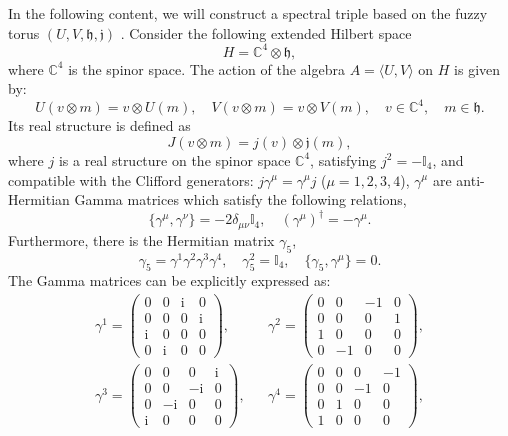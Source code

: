 \documentclass[a4paper,11pt]{article}
\begin{document}
In the following content, we will construct a spectral triple based on the fuzzy torus
$(U, V, \mathfrak{h}, \mathfrak{j})$ \cite{Bigatti1}. Consider the following
extended Hilbert space
\begin{equation}
  H =\mathbb{C}^4 \otimes \mathfrak{h},
\end{equation}
where $\mathbb{C}^4$ is the spinor space. The action of the algebra $A =
\langle U, V \rangle$ on $H$ is given by:
\begin{equation}
  U (v \otimes m) = v \otimes U (m), \quad V (v \otimes m) = v \otimes V (m),
  \quad v \in \mathbb{C}^4, \quad m \in \mathfrak{h}.
\end{equation}
Its real structure is defined as
\begin{equation}
  J (v \otimes m) = j (v) \otimes \mathfrak{j} (m),
\end{equation}
where $j$ is a real structure on the spinor space $\mathbb{C}^4$, satisfying
$j^2 = -\mathbb{I}_4$, and compatible with the Clifford generators: $j
\gamma^{\mu} = \gamma^{\mu} j$ ($\mu = 1, 2, 3, 4$), $\gamma^{\mu}$ are
anti-Hermitian Gamma matrices which satisfy the following relations,
\begin{equation}
  \{\gamma^{\mu}, \gamma^{\nu} \} = - 2 \delta_{\mu \nu} \mathbb{I}_4, \quad
  (\gamma^{\mu})^{\dag} = - \gamma^{\mu}.
\end{equation}
Furthermore, there is the Hermitian matrix $\gamma_5$,
\begin{equation}
  \gamma_5 = \gamma^1 \gamma^2 \gamma^3 \gamma^4, \quad \gamma_5^2
  =\mathbb{I}_4, \quad \{\gamma_5, \gamma^{\mu} \} = 0.
\end{equation}
The Gamma matrices can be explicitly expressed as:
\begin{eqnarray}
  \gamma^1 = \left( \begin{array}{cccc}
    0 & 0 & \mathrm{i} & 0\\
    0 & 0 & 0 & \mathrm{i}\\
    \mathrm{i} & 0 & 0 & 0\\
    0 & \mathrm{i} & 0 & 0
  \end{array} \right), && \gamma^2 = \left( \begin{array}{cccc}
    0 & 0 & - 1 & 0\\
    0 & 0 & 0 & 1\\
    1 & 0 & 0 & 0\\
    0 & - 1 & 0 & 0
  \end{array} \right),
\nonumber\\
  \gamma^3 = \left( \begin{array}{cccc}
    0 & 0 & 0 & \mathrm{i}\\
    0 & 0 & - \mathrm{i} & 0\\
    0 & - \mathrm{i} & 0 & 0\\
    \mathrm{i} & 0 & 0 & 0
  \end{array} \right), && \gamma^4 = \left( \begin{array}{cccc}
    0 & 0 & 0 & - 1\\
    0 & 0 & - 1 & 0\\
    0 & 1 & 0 & 0\\
    1 & 0 & 0 & 0
  \end{array} \right),
\end{eqnarray} 
\end{document}
